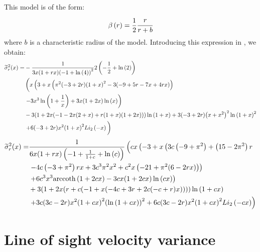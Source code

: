 This model is of the form:
%
\begin{equation}
    \beta \left(r\right) = \frac{1}{2}\cfrac{r}{r+b}
\end{equation}
%
where $b$ is a characteristic radius of the model. Introducing this expression
in , we obtain:
%
\begin{align}
    \widetilde\sigma_r^2(x)=&
        -\frac{1}{3 x (1+r x)
        {(-1+\ln\left(4\right))}^2}2
        \left(-\frac{1}{2}+\ln\left(2\right)\right)\nonumber\\
    &\left(x \left(3+x \left(\pi ^2 (-3+2 r)
        {(1+x)}^2-3 (-9+5 r-7 x+4 r x)
        \right)\right.\vphantom{\ln\left(1+\frac{1}{x}\right)}\right.
        \nonumber\\
    &\left.-3 x^3 \ln\left(1+\frac{1}{x}\right)+3 x (1+2 x)
        \ln\left(x\right)\right)\nonumber\\
    & -3 (1+2 x (-1-2 x (2+x)+r (1+x) (1+2 x)))
        \ln\left(1+x\right)+3 (-3+2 r) {\left(x+x^2\right)}^2
        \ln{\left(1+x\right)}^2\nonumber\\
    & \left.+6 (-3+2 r) x^2 {(1+x)}^2
        Li_2\left(-x\right)\vphantom{\ln\left(1+\frac{1}{x}\right)}\right)
        \nonumber\\
\end{align}
\begin{align}
    \widetilde\sigma_r^2(x)=&
        \frac{1}{6 x (1+r x) \left(-1+\frac{1}{1+c}+\ln\left(c\right)\right)}
        \left(c x \left(-3+x \left(3 c \left(-9+\pi ^2\right)+
        \left(15-2 \pi ^2\right) r\right.\right.
        \vphantom{{(1+c x)}^2}\right.\\
    &\left. -4 c \left(-3+\pi ^2\right) r x+
        3 c^3 \pi ^2 x^2+c^2 x \left(-21+\pi ^2 (6-2 r x)\right)\right)\\
    & \left.+6 c^3 x^3 {\rm arccoth} \left(1+2 c x\right)-
        3 c x (1+2 c x) \ln\left(c x\right)\right)\\
    &+3(1+2 x (r+c (-1+x (-4 c+3 r+2 c (-c+r) x))))
        \ln\left(1+c x\right)\\
    &\left.+3c(3 c-2 r) x^2 {(1+c x)}^2 {\left(\ln\left(1+c x\right)\right)}^2+
        6 c (3 c-2 r) x^2 {(1+c x)}^2 Li_2\left(-c x\right)\right)\\
\end{align}

\section{Line of sight velocity variance}

